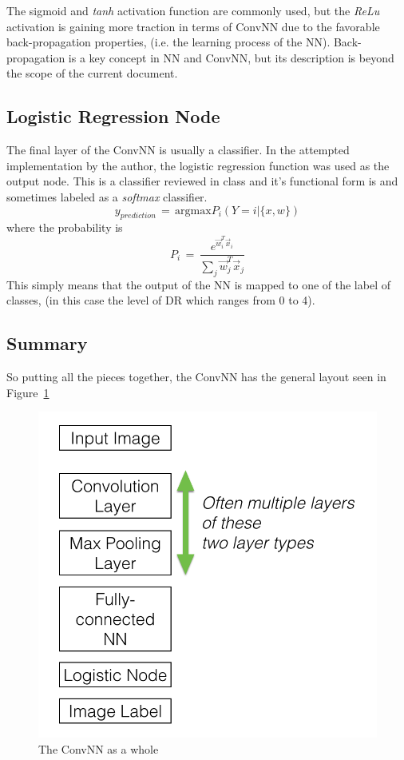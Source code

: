 \documentclass[letterpaper,12pt]{article}
\newcommand{\figref}[1]{Figure~\ref{#1}}
\begin{document}
The sigmoid and \textit{tanh} activation function are commonly used, but the \textit{ReLu} activation is gaining more traction in terms of ConvNN due to the favorable back-propagation properties, (i.e. the learning process of the NN). Back-propagation is a key concept in NN and ConvNN, but its description is beyond the scope of the current document.

\subsection{Logistic Regression Node}

The final layer of the ConvNN is usually a classifier. In the attempted implementation by the author, the logistic regression function was used as the output node. This is a classifier reviewed in class and it's functional form is \cite{deep} and sometimes labeled as a \textit{softmax} classifier.
\begin{equation}
y_{prediction} \, = \, \text{argmax} P_i (Y = i | \{x, w\})
\end{equation}
where the probability is
\begin{equation}
P_i \, = \, \frac{e^{\vec{w}_i^T \vec{x}_i}}{\sum_j \vec{w}_j^T \vec{x}_j }
\end{equation}
This simply means that the output of the NN is mapped to one of the label of classes, (in this case the level of DR which ranges from 0 to 4).

\subsection{Summary}

So putting all the pieces together,  the ConvNN has the general layout seen in \figref{summary}

\begin{figure}[htbp]
\begin{center}
\includegraphics[scale=0.6]{images/summaryNN.png}
\caption{The ConvNN as a whole}
\label{summary}
\end{center}
\end{figure}
\end{document}
